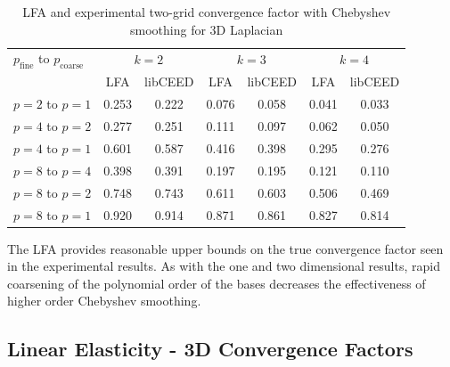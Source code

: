 \documentclass[review]{siamart190516}
\begin{document}
\begin{table}[ht!]
\begin{center}
\begin{tabular}{l cc cc cc}
  \toprule
  $p_{\text{fine}}$ to $p_{\text{coarse}}$  &  \multicolumn{2}{c}{$k = 2$}  &  \multicolumn{2}{c}{$k = 3$}  &  \multicolumn{2}{c}{$k = 4$}  \\
                      &  LFA  &  libCEED  &  LFA  &  libCEED  &  LFA  &  libCEED  \\
  \toprule
  $p = 2$ to $p = 1$  &  0.253 & 0.222  &  0.076 & 0.058  &  0.041 & 0.033  \\
  \midrule
  $p = 4$ to $p = 2$  &  0.277 & 0.251  &  0.111 & 0.097  &  0.062 & 0.050  \\
  $p = 4$ to $p = 1$  &  0.601 & 0.587  &  0.416 & 0.398  &  0.295 & 0.276  \\
  \midrule
  $p = 8$ to $p = 4$  &  0.398 & 0.391  &  0.197 & 0.195  &  0.121 & 0.110  \\
  $p = 8$ to $p = 2$  &  0.748 & 0.743  &  0.611 & 0.603  &  0.506 & 0.469  \\
  $p = 8$ to $p = 1$  &  0.920 & 0.914  &  0.871 & 0.861  &  0.827 & 0.814  \\
  \bottomrule
\end{tabular}
\end{center}
\caption{LFA and experimental two-grid convergence factor with Chebyshev smoothing for 3D Laplacian}
\label{table:two_grid_3d_chebyshev}
\end{table}

The LFA provides reasonable upper bounds on the true convergence factor seen in the experimental results.
As with the one and two dimensional results, rapid coarsening of the polynomial order of the bases decreases the effectiveness of higher order Chebyshev smoothing.

\subsection{Linear Elasticity - 3D Convergence Factors}\label{sec:solidsresults}
\end{document}
